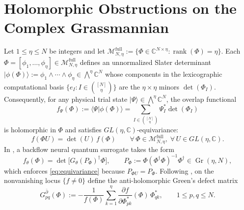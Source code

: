 \documentclass[11pt,a4paper]{article}
\theoremstyle{definition}
\DeclareMathOperator{\rank}{rank}
\DeclareMathOperator{\Gr}{Gr}
\newcommand{\C}{\mathbb{C}}
\newcommand{\ket}[1]{\lvert #1 \rangle}
\newcommand{\braket}[2]{\langle #1 \vert #2 \rangle}
\begin{document}
\section{Holomorphic Obstructions on the Complex Grassmannian}

Let $1 \le \eta \le N$ be integers and let $\mathcal{M}_{N,\eta}^{\mathrm{full}} := \{\Phi \in \C^{N\times \eta} : \rank(\Phi) = \eta\}$. Each $\Phi = [\phi_1,\dots,\phi_\eta] \in \mathcal{M}_{N,\eta}^{\mathrm{full}}$ defines an unnormalized Slater determinant $\ket{\phi(\Phi)} := \phi_1 \wedge \cdots \wedge \phi_\eta \in \bigwedge^\eta \C^N$ whose components in the lexicographic computational basis $\{e_I : I \in \binom{[N]}{\eta}\}$ are the $\eta \times \eta$ minors $\det(\Phi_I)$. Consequently, for any physical trial state $\ket{\Psi} \in \bigwedge^\eta \C^N$, the overlap functional
\[
  f_\Psi(\Phi) := \braket{\Psi}{\phi(\Phi)} = \sum_{I \in \binom{[N]}{\eta}} \Psi_I^* \det(\Phi_I)
\]
is holomorphic in $\Phi$ and satisfies $GL(\eta, \C)$-equivariance:
\begin{equation}\label{eq:equivariance}
  f(\Phi U) = \det(U)\, f(\Phi) \qquad \forall\, \Phi \in \mathcal{M}_{N,\eta}^{\mathrm{full}},\; \forall\, U \in GL(\eta, \C).
\end{equation}
In \cite[Eq.~(S2.19)--(S2.22)]{jiang2026machine}, a backflow neural quantum surrogate takes the form
\begin{equation}\label{eq:backflow}
  f_\theta(\Phi) = \det\!\big[G_\theta(P_\Phi)^\dagger \Phi\big], \qquad P_\Phi := \Phi (\Phi^\dagger \Phi)^{-1} \Phi^\dagger \in \Gr(\eta, N),
\end{equation}
which enforces \eqref{eq:equivariance} because $P_{\Phi U} = P_\Phi$. Following \cite[Eq.~(S2.22)]{jiang2026machine}, on the nonvanishing locus $\{f \neq 0\}$ define the anti-holomorphic Green's defect matrix
\begin{equation}\label{eq:gdbar}
  G_{pq}^{\bar{\partial}}(\Phi) := -\frac{1}{f(\Phi)} \sum_{k=1}^{\eta} \frac{\partial f}{\partial \Phi^*_{pk}}(\Phi)\, \Phi^*_{qk}, \qquad 1 \le p,q \le N.
\end{equation}
\end{document}
